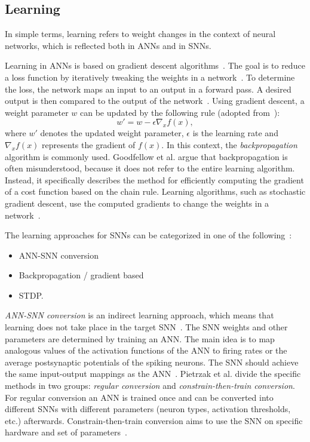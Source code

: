\subsection{Learning}
In simple terms, learning refers to weight changes in the context of neural networks, which is reflected both in \acp{ANN} and in \acp{SNN}.

Learning in \acp{ANN} is based on gradient descent algorithms~\cite{maass_networks_1997}.
The goal is to reduce a loss function by iteratively tweaking the weights in a network~\cite{taye_understanding_2023}.
To determine the loss, the network maps an input to an output in a forward pass.
A desired output is then compared to the output of the network~\cite{esser_backpropagation_2015}.
Using gradient descent, a weight parameter \(w\) can be updated by the following rule (adopted from~\cite[p.83]{goodfellow_deep_2016}):
\begin{equation}
      w' = w - \epsilon\nabla_xf(x),
\end{equation}
where \(w'\) denotes the updated weight parameter, \(\epsilon\) is the learning rate and \(\nabla_xf(x)\) represents the gradient of \(f(x)\).
In this context, the \textit{backpropagation} algorithm is commonly used.
Goodfellow et al. argue that backpropagation is often misunderstood, because it does not refer to the entire learning algorithm.
Instead, it specifically describes the method for efficiently computing the gradient of a cost function based on the chain rule.
Learning algorithms, such as stochastic gradient descent, use the computed gradients to change the weights in a network~\cite[p.200ff.]{goodfellow_deep_2016}.

The learning approaches for \acp{SNN} can be categorized in one of the following~\cite{yamazaki_spiking_2022, pietrzak_overview_2023, nunes_spiking_2022}: 
\begin{itemize}
    \item \ac{ANN}-\ac{SNN} conversion
    \item Backpropagation / gradient based
    \item \ac{STDP}.
\end{itemize}

\textit{\ac{ANN}-\ac{SNN} conversion} is an indirect learning approach, which means that learning does not take place in the target \ac{SNN}~\cite{nunes_spiking_2022}.
The \ac{SNN} weights and other parameters are determined by training an \ac{ANN}.
The main idea is to map analogous values of the activation functions of the \ac{ANN} to firing rates or the average postsynaptic potentials of the spiking neurons.
The \ac{SNN} should achieve the same input-output mappings as the \ac{ANN}~\cite{pietrzak_overview_2023}.
Pietrzak et al. divide the specific methods in two groups: \textit{regular conversion} and \textit{constrain-then-train conversion}.
For regular conversion an \ac{ANN} is trained once and can be converted into different \acp{SNN} with different parameters (neuron types, activation thresholds, etc.) afterwards.
Constrain-then-train conversion aims to use the \ac{SNN} on specific hardware and set of parameters~\cite{pietrzak_overview_2023}.

